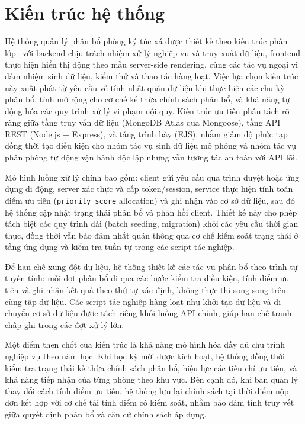 ﻿\documentclass[a4paper,12pt,openany,oneside]{report}
\begin{document}
\section{Kiến trúc hệ thống}

Hệ thống quản lý phân bổ phòng ký túc xá được thiết kế theo kiến trúc phân lớp~\cite{fowler2002patterns} với backend chịu trách nhiệm xử lý nghiệp vụ và truy xuất dữ liệu, frontend thực hiện hiển thị động theo mẫu server-side rendering, cùng các tác vụ ngoại vi đảm nhiệm sinh dữ liệu, kiểm thử và thao tác hàng loạt. Việc lựa chọn kiến trúc này xuất phát từ yêu cầu về tính nhất quán dữ liệu khi thực hiện các chu kỳ phân bổ, tính mở rộng cho cơ chế kế thừa chính sách phân bổ, và khả năng tự động hóa các quy trình xử lý vi phạm nội quy. Kiến trúc ưu tiên phân tách rõ ràng giữa tầng truy vấn dữ liệu (MongoDB Atlas qua Mongoose), tầng API REST (Node.js + Express), và tầng trình bày (EJS), nhằm giảm độ phức tạp đồng thời tạo điều kiện cho nhóm tác vụ sinh dữ liệu mô phỏng và nhóm tác vụ phân phòng tự động vận hành độc lập nhưng vẫn tương tác an toàn với API lõi.

Mô hình luồng xử lý chính bao gồm: client gửi yêu cầu qua trình duyệt hoặc ứng dụng di động, server xác thực và cấp token/session, service thực hiện tính toán điểm ưu tiên (\texttt{priority\_score} allocation) và ghi nhận vào cơ sở dữ liệu, sau đó hệ thống cập nhật trạng thái phân bổ và phản hồi client. Thiết kế này cho phép tách biệt các quy trình dài (batch seeding, migration) khỏi các yêu cầu thời gian thực, đồng thời vẫn bảo đảm nhất quán thông qua cơ chế kiểm soát trạng thái ở tầng ứng dụng và kiểm tra tuần tự trong các script tác nghiệp.

Để hạn chế xung đột dữ liệu, hệ thống thiết kế các tác vụ phân bổ theo trình tự tuyến tính: mỗi đợt phân bổ đi qua các bước kiểm tra điều kiện, tính điểm ưu tiên và ghi nhận kết quả theo thứ tự xác định, không thực thi song song trên cùng tập dữ liệu. Các script tác nghiệp hàng loạt như khởi tạo dữ liệu và di chuyển cơ sở dữ liệu được tách riêng khỏi luồng API chính, giúp hạn chế tranh chấp ghi trong các đợt xử lý lớn.

Một điểm then chốt của kiến trúc là khả năng mô hình hóa đầy đủ chu trình nghiệp vụ theo năm học. Khi học kỳ mới được kích hoạt, hệ thống đồng thời kiểm tra trạng thái kế thừa chính sách phân bổ, hiệu lực các tiêu chí ưu tiên, và khả năng tiếp nhận của từng phòng theo khu vực. Bên cạnh đó, khi ban quản lý thay đổi cách tính điểm ưu tiên, hệ thống lưu lại chính sách tại thời điểm nộp đơn kết hợp với cơ chế tái tính điểm có kiểm soát, nhằm bảo đảm tính truy vết giữa quyết định phân bổ và căn cứ chính sách áp dụng.
\end{document}
